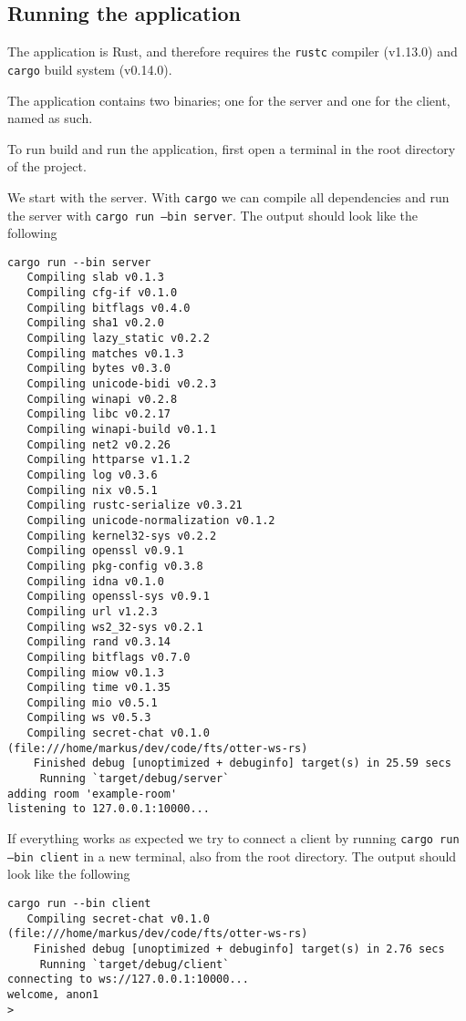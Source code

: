 
\subsection{Running the application}
The application is Rust, and therefore requires the {\tt rustc}
compiler (v1.13.0) and {\tt cargo} build system (v0.14.0).

The application contains two binaries; one for the server and one for
the client, named as such.

To run build and run the application, first open a terminal in the
root directory of the project.

We start with the server. With {\tt cargo} we can compile all
dependencies and run the server with {\tt cargo run --bin server}. The
output should look like the following
\begin{verbatim}
cargo run --bin server
   Compiling slab v0.1.3
   Compiling cfg-if v0.1.0
   Compiling bitflags v0.4.0
   Compiling sha1 v0.2.0
   Compiling lazy_static v0.2.2
   Compiling matches v0.1.3
   Compiling bytes v0.3.0
   Compiling unicode-bidi v0.2.3
   Compiling winapi v0.2.8
   Compiling libc v0.2.17
   Compiling winapi-build v0.1.1
   Compiling net2 v0.2.26
   Compiling httparse v1.1.2
   Compiling log v0.3.6
   Compiling nix v0.5.1
   Compiling rustc-serialize v0.3.21
   Compiling unicode-normalization v0.1.2
   Compiling kernel32-sys v0.2.2
   Compiling openssl v0.9.1
   Compiling pkg-config v0.3.8
   Compiling idna v0.1.0
   Compiling openssl-sys v0.9.1
   Compiling url v1.2.3
   Compiling ws2_32-sys v0.2.1
   Compiling rand v0.3.14
   Compiling bitflags v0.7.0
   Compiling miow v0.1.3
   Compiling time v0.1.35
   Compiling mio v0.5.1
   Compiling ws v0.5.3
   Compiling secret-chat v0.1.0 (file:///home/markus/dev/code/fts/otter-ws-rs)
    Finished debug [unoptimized + debuginfo] target(s) in 25.59 secs
     Running `target/debug/server`
adding room 'example-room'
listening to 127.0.0.1:10000...
\end{verbatim}

If everything works as expected we try to connect a client by running
{\tt cargo run --bin client} in a new terminal, also from the root
directory. The output should look like the following
\begin{verbatim}
cargo run --bin client
   Compiling secret-chat v0.1.0 (file:///home/markus/dev/code/fts/otter-ws-rs)
    Finished debug [unoptimized + debuginfo] target(s) in 2.76 secs
     Running `target/debug/client`
connecting to ws://127.0.0.1:10000...
welcome, anon1
>
\end{verbatim}

